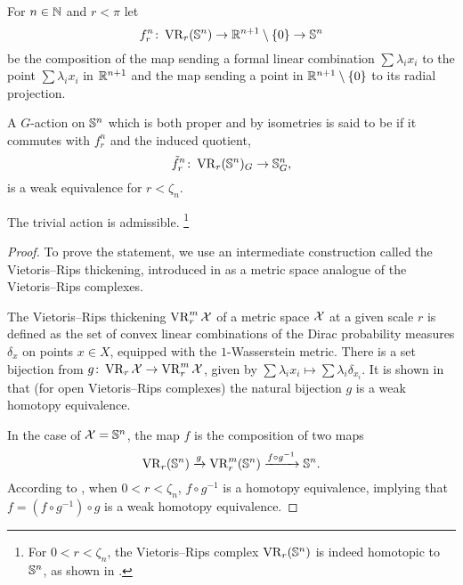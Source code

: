 \subsubsection{}\label{subsub:f}

For \(n \in \mathbb{N}\) and \(r < \pi\) let
\[
f_r^n \colon \operatorname{VR}_r(\mathbb{S}^n) \to \mathbb{R}^{n+1} \setminus \{0\} \to \mathbb{S}^n
\]
be the composition of the map sending a formal linear combination $\sum\lambda_i x_i$ to the point \(\sum\lambda_i x_i\) in \(\mathbb{R}^{n+1}\) and the map sending a point in \(\mathbb{R}^{n+1} \setminus \{0\}\) to its radial projection.

A \(G\)-action on \(\mathbb{S}^n\) which is both proper and by isometries is said to be  if it commutes with \(f_r^n\) and the induced quotient,
\[
\tilde f_r^n \colon \operatorname{VR}_r(\mathbb{S}^n)_G \to \mathbb{S}^n_G,
\]
is a weak equivalence for $r < \zeta_n$.

\medskip\lemma
The trivial action is admissible.
\footnote{For $0 < r < \zeta_n$, the Vietoris--Rips complex $\operatorname{VR}_r(\mathbb{S}^n)$ is indeed homotopic to $\mathbb{S}^n$, as shown in \cite[Theorem 7.1]{lim2020vietoris}.}

\begin{proof}
	To prove the statement, we use an intermediate construction called the Vietoris--Rips thickening, introduced in \cite{adamaszek2018metric} as a metric space analogue of the Vietoris--Rips complexes.

	The Vietoris--Rips thickening $\operatorname{VR}_r^m\mathcal{X}$ of a metric space $\mathcal{X}$ at a given scale $r$ is defined as the set of convex linear combinations of the Dirac probability measures $\delta_{x}$ on points $x \in X$, equipped with the $1$-Wasserstein metric.
	There is a set bijection from $g \colon \operatorname{VR}_r\mathcal{X} \to \operatorname{VR}_r^m\mathcal{X}$, given by $\sum \lambda_i x_i \mapsto \sum \lambda_i \delta_{x_i}.$
	It is shown in \cite[Theorem 1]{gillespie2024vietoris} that (for open Vietoris--Rips complexes) the natural bijection $g$ is a weak homotopy equivalence.

	In the case of $\mathcal{X} = \mathbb{S}^n$, the map $f$ is the composition of two maps
	\[
	\operatorname{VR}_r(\mathbb{S}^n) \xrightarrow{g} \operatorname{VR}_r^m(\mathbb{S}^n) \xrightarrow{f \circ g^{-1}} \mathbb{S}^n.
	\]
	According to \cite[Proposition 5.3]{adamaszek2018metric}, when $0<r<\zeta_n$, $f \circ g^{-1}$ is a homotopy equivalence, implying that $f = (f \circ g^{-1}) \circ g$ is a weak homotopy equivalence.
\end{proof}

